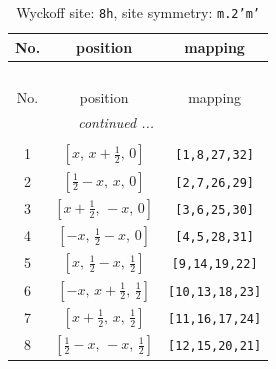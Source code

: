 \documentclass[fleqn,8pt]{jsarticle}
\begin{document}
\begin{longtable}{ccc}
\caption{Wyckoff site: {\tt 8h}, site symmetry: {\tt m.2'm'}}
 \\
 \hline \hline
No. & position & mapping \\ \hline \endfirsthead

\multicolumn{2}{l}{\tablename\ \thetable{}} \\
 \hline \hline
No. & position & mapping \\ \hline \endhead

 \hline \hline
\multicolumn{2}{r}{\footnotesize\it continued ...} \\ \endfoot

 \hline \hline
\multicolumn{2}{r}{} \\ \endlastfoot

1 & $\left[ x,\, x + \frac{1}{2},\, 0 \right]$ & {\tt [1,8,27,32]} \\ \hline
2 & $\left[ \frac{1}{2} - x,\, x,\, 0 \right]$ & {\tt [2,7,26,29]} \\ \hline
3 & $\left[ x + \frac{1}{2},\, - x,\, 0 \right]$ & {\tt [3,6,25,30]} \\ \hline
4 & $\left[ - x,\, \frac{1}{2} - x,\, 0 \right]$ & {\tt [4,5,28,31]} \\ \hline
5 & $\left[ x,\, \frac{1}{2} - x,\, \frac{1}{2} \right]$ & {\tt [9,14,19,22]} \\ \hline
6 & $\left[ - x,\, x + \frac{1}{2},\, \frac{1}{2} \right]$ & {\tt [10,13,18,23]} \\ \hline
7 & $\left[ x + \frac{1}{2},\, x,\, \frac{1}{2} \right]$ & {\tt [11,16,17,24]} \\ \hline
8 & $\left[ \frac{1}{2} - x,\, - x,\, \frac{1}{2} \right]$ & {\tt [12,15,20,21]} \\
\end{longtable}
\renewcommand{\arraystretch}{1.2}
\end{document}

